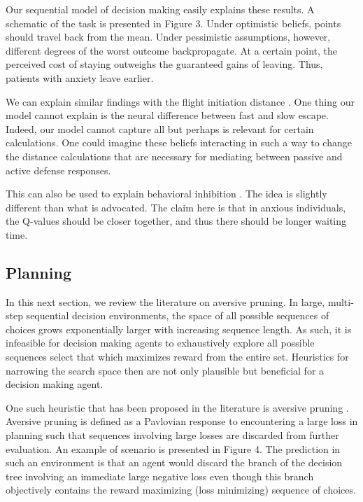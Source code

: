 \documentclass[11pt]{article} %
\begin{document}
Our sequential model of decision making easily explains these results. A schematic
of the task is presented in Figure 3. Under optimistic beliefs, points should
travel back from the mean. Under pessimistic assumptions, however, different
degrees of the worst outcome backpropagate. At a certain point, the perceived cost
of staying outweighs the guaranteed gains of leaving. Thus, patients with anxiety
leave earlier.

We can explain similar findings with the flight initiation distance \citep{Mobbs2018,
Mobbs2019}. One thing our model cannot explain is the neural difference between
fast and slow escape. Indeed, our model cannot capture all but perhaps is relevant
for certain calculations. One could imagine these beliefs interacting in such a
way to change the distance calculations that are necessary for mediating between
passive and active defense responses.

This can also be used to explain behavioral inhibition \citep{bach2015, khemka2017}.
The idea is slightly different than what is advocated. The claim here is that
in anxious individuals, the Q-values should be closer together, and thus there
should be longer waiting time.

\subsection{Planning}

In this next section, we review the literature on aversive pruning. In large,
multi-step sequential decision environments, the space of all possible sequences
of choices grows exponentially larger with increasing sequence length. As such,
it is infeasible for decision making agents to exhaustively explore all possible
sequences select that which maximizes reward from the entire set. Heuristics for
narrowing the search space then are not only plausible but beneficial for a
decision making agent.

One such heuristic that has been proposed in the literature is aversive pruning
\citep{Huys2012}. Aversive pruning is defined as a Pavlovian response to encountering
a large loss in planning such that sequences involving large losses are discarded
from further evaluation. An example of scenario is presented in Figure 4. The prediction
in such an environment is that an agent would discard the branch of the decision
tree involving an immediate large negative loss even though this branch objectively
contains the reward maximizing (loss minimizing) sequence of choices.
\end{document}
